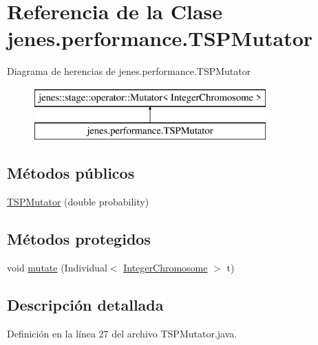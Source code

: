 \hypertarget{classjenes_1_1performance_1_1_t_s_p_mutator}{\section{Referencia de la Clase jenes.\-performance.\-T\-S\-P\-Mutator}
\label{classjenes_1_1performance_1_1_t_s_p_mutator}
}
Diagrama de herencias de jenes.\-performance.\-T\-S\-P\-Mutator\begin{figure}[H]
\begin{center}
\leavevmode
\includegraphics[height=2.000000cm]{classjenes_1_1performance_1_1_t_s_p_mutator}
\end{center}
\end{figure}
\subsection*{Métodos públicos}
\begin{DoxyCompactItemize}
\item 
\hyperlink{classjenes_1_1performance_1_1_t_s_p_mutator_a66ff4b3c4ac9985a10c35e6bf4005904}{T\-S\-P\-Mutator} (double probability)
\end{DoxyCompactItemize}
\subsection*{Métodos protegidos}
\begin{DoxyCompactItemize}
\item 
void \hyperlink{classjenes_1_1performance_1_1_t_s_p_mutator_aefe31787293640658a112692d2c103d5}{mutate} (Individual$<$ \hyperlink{classjenes_1_1chromosome_1_1_integer_chromosome}{Integer\-Chromosome} $>$ t)
\end{DoxyCompactItemize}


\subsection{Descripción detallada}


Definición en la línea 27 del archivo T\-S\-P\-Mutator.\-java.



